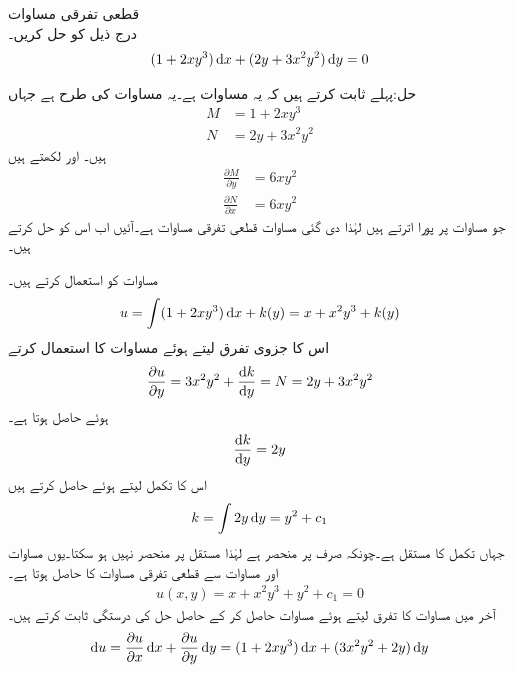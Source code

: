\quad قطعی تفرقی مساوات\\
درج ذیل کو حل کریں۔
\begin{align}\label{مساوات_سادہ_اول_مثال_قطعی_الف}
(1+2xy^3)\dif x+(2y+3x^2y^2)\dif y=0
\end{align}

حل:پہلے ثابت کرتے ہیں کہ یہ مساوات  ہے۔یہ مساوات  کی طرح ہے جہاں
\begin{align*}
M&=1+2xy^3\\
N&=2y+3x^2y^2
\end{align*}
ہیں۔  اور  لکھتے ہیں
\begin{align*}
\frac{\partial M}{\partial y}&=6xy^2\\
\frac{\partial N}{\partial x}&=6xy^2
\end{align*}
جو مساوات  پر پورا اترتے ہیں لہٰذا دی گئی مساوات قطعی تفرقی مساوات  ہے۔آئیں اب اس کو حل کرتے ہیں۔

مساوات  کو استعمال کرتے ہیں۔
\begin{align}\label{مساوات_سادہ_اول_قطعی_حل_پ}
u=\int (1+2xy^3)\dif x+k(y)=x+x^2y^3+k(y) 
\end{align}
اس کا  جزوی تفرق لیتے ہوئے مساوات  کا استعمال کرتے
\begin{align*}
\frac{\partial u}{\partial y}=3x^2y^2+\frac{\dif k}{\dif y}=N=2y+3x^2y^2
\end{align*}
ہوئے  حاصل ہوتا ہے۔
\begin{align*}
\frac{\dif k}{\dif y}=2y
\end{align*}
اس کا  تکمل لیتے ہوئے  حاصل کرتے ہیں
\begin{align} \label{مساوات_سادہ_اول_قطعی_حل_ت}
k=\int 2y \dif y=y^2+c_1
\end{align}
جہاں  تکمل کا مستقل ہے۔چونکہ  صرف   پر منحصر ہے لہٰذا  مستقل  پر منحصر نہیں ہو سکتا۔یوں مساوات  اور مساوات  سے قطعی تفرقی مساوات کا حاصل ہوتا ہے۔
\begin{align}\label{مساوات_سادہ_اول_قطعی_حل_ٹ}
u(x,y)=x+x^2y^3+y^2+c_1=0
\end{align}
آخر میں مساوات  کا تفرق لیتے ہوئے مساوات   حاصل کر کے حاصل حل کی درستگی ثابت کرتے ہیں۔
\begin{align*}
\dif u=\frac{\partial u}{\partial x}\dif x+\frac{\partial u}{\partial y}\dif y=(1+2xy^3)\dif x+(3x^2y^2+2y)\dif y
\end{align*}

